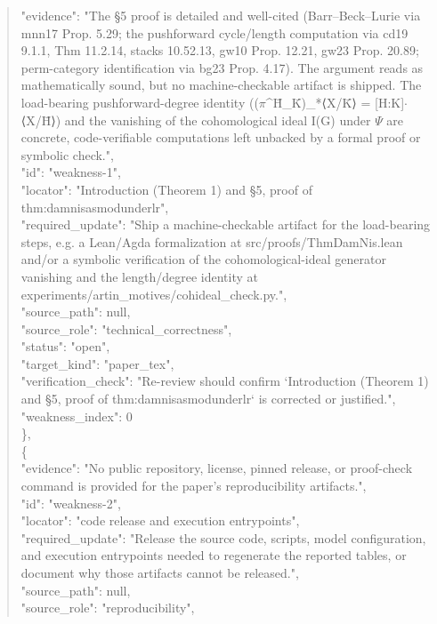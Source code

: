 \documentclass[11pt]{article}
\begin{document}
\begin{quote}
      "evidence": "The §5 proof is detailed and well-cited (Barr--Beck--Lurie via mnn17 Prop. 5.29; the pushforward cycle/length computation via cd19 9.1.1, Thm 11.2.14, stacks 10.52.13, gw10 Prop. 12.21, gw23 Prop. 20.89; perm-category identification via bg23 Prop. 4.17). The argument reads as mathematically sound, but no machine-checkable artifact is shipped. The load-bearing pushforward-degree identity ((\ensuremath{\pi}\^{}H\={}\_K\={})\_*⟨X/K\={}⟩ = [H:K]\ensuremath{\cdot}⟨X/H\={}⟩) and the vanishing of the cohomological ideal I(G) under \ensuremath{\Psi} are concrete, code-verifiable computations left unbacked by a formal proof or symbolic check.",\\
      "id": "weakness-1",\\
      "locator": "Introduction (Theorem 1) and §5, proof of thm:damnisasmodunderlr",\\
      "required\_update": "Ship a machine-checkable artifact for the load-bearing steps, e.g. a Lean/Agda formalization at src/proofs/ThmDamNis.lean and/or a symbolic verification of the cohomological-ideal generator vanishing and the length/degree identity at experiments/artin\_motives/cohideal\_check.py.",\\
      "source\_path": null,\\
      "source\_role": "technical\_correctness",\\
      "status": "open",\\
      "target\_kind": "paper\_tex",\\
      "verification\_check": "Re-review should confirm `Introduction (Theorem 1) and §5, proof of thm:damnisasmodunderlr` is corrected or justified.",\\
      "weakness\_index": 0\\
    \},\\
    \{\\
      "evidence": "No public repository, license, pinned release, or proof-check command is provided for the paper's reproducibility artifacts.",\\
      "id": "weakness-2",\\
      "locator": "code release and execution entrypoints",\\
      "required\_update": "Release the source code, scripts, model configuration, and execution entrypoints needed to regenerate the reported tables, or document why those artifacts cannot be released.",\\
      "source\_path": null,\\
      "source\_role": "reproducibility",\\

\end{quote}
\end{document}
